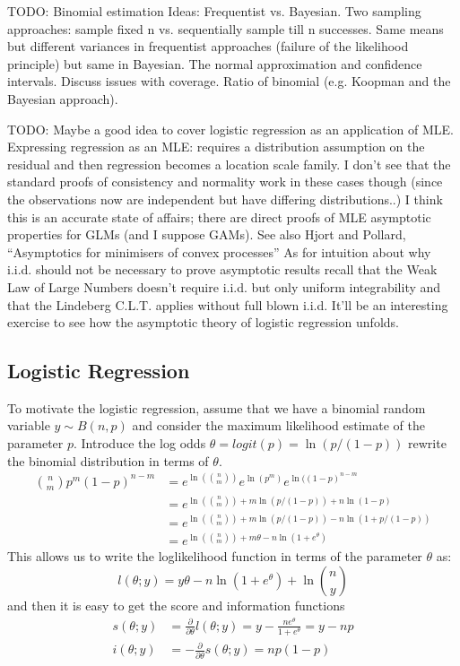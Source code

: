 TODO: Binomial estimation
Ideas:  Frequentist vs. Bayesian.  Two sampling approaches: sample
fixed n vs. sequentially sample till n successes.  Same means but
different variances in frequentist approaches (failure of the
likelihood principle) but same in Bayesian.
The normal approximation and confidence intervals.  Discuss issues
with coverage.  Ratio of binomial (e.g. Koopman and the Bayesian approach).

TODO: Maybe a good idea to cover logistic regression as an application
of MLE.  Expressing regression as an MLE: requires a distribution
assumption on the residual and then regression becomes a location
scale family.  I don't see that the standard proofs of consistency and
normality work in these cases though (since the observations now are
independent but have differing distributions..)  I think this is an
accurate state of affairs; there are direct proofs of MLE asymptotic
properties for GLMs (and I suppose GAMs).  See also Hjort and Pollard,
``Asymptotics for minimisers of convex processes''  As for intuition
about why i.i.d. should not be necessary to prove asymptotic results
recall that the Weak Law of Large Numbers doesn't require i.i.d. but
only uniform integrability and that the Lindeberg C.L.T. applies
without full blown i.i.d.  It'll be an interesting exercise to see how
the asymptotic theory of logistic regression unfolds.

\subsection{Logistic Regression}
To motivate the logistic regression, assume that we have a binomial
random variable $y \sim B(n,p)$ and consider the maximum likelihood
estimate of the parameter $p$.  Introduce the log odds $\theta =
logit(p) = \ln(p/(1-p))$ rewrite the binomial
distribution in terms of $\theta$.
\begin{align}
\binom{n}{m}p^m(1-p)^{n-m} & = e^{\ln(\binom{n}{m})}
e^{\ln(p^m)}e^{\ln((1-p)^{n-m}} \\
& = e^{\ln(\binom{n}{m}) + m \ln(p/(1-p)) +
  n \ln(1-p)} \\
& = e^{\ln(\binom{n}{m}) + m \ln(p/(1-p)) -  n \ln(1 + p/(1-p))} \\
& = e ^ {\ln(\binom{n}{m}) + m \theta - n \ln(1+e^\theta)}
\end{align}
This allows us to write the loglikelihood function in terms of the
parameter $\theta$ as:
$$
l(\theta; y) = y\theta - n\ln(1+e^\theta) + \ln\binom{n}{y}
$$
and then it is easy to get the score and information functions
\begin{align}
s(\theta; y) & = \frac{\partial}{\partial \theta} l(\theta;y) = y -
\frac{n e^\theta}{1+e^\theta}= y - np \\
i(\theta; y) & = -\frac{\partial}{\partial \theta} s(\theta;y) = np(1-p)
\end{align}


